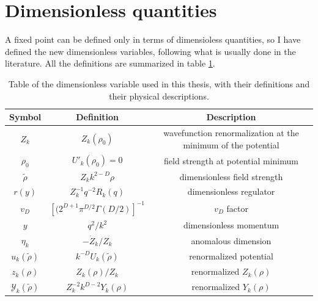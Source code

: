 \section{Dimensionless quantities}
A fixed point can be defined only in terms of dimensioless quantities, so I have defined the new dimensionless variables, following what is usually done in the literature. All the definitions are summarized in table \ref{tab:DIMENSIONLESS}.


\begin{table}
  \begin{center}
    \begin{small}
      \begin{tabular}{|c|c|c|}

\hline
 \textbf{Symbol}& \textbf{Definition} & \textbf{Description}  \\
\hline
$Z_k$ & $Z_k(\rho_0)$ & wavefunction renormalization at the minimum of the potential\\
\hline
$\rho_0$ & $U'_k(\rho_0) = 0$ & field strength at potential minimum\\
\hline
$\widetilde{\rho}$ & $Z_kk^{2-D}\rho$ & dimensionless field strength \\
\hline
$r(y)$ & $Z^{-1}_k q^{-2}R_k(q)$ & dimensionless regulator\\
\hline
$v_D$ & $[(2^{D + 1}\pi^{D/2}\Gamma(D/2)]^{-1}$ & $v_D$ factor\\
\hline
$y$ & $q^2/k^2$ & dimensionless momentum\\
\hline
$\eta_k$ & $-\dot{Z}_k/Z_k$ & anomalous dimension\\
\hline
$u_k(\widetilde{\rho})$ & $k^{-D}U_k(\widetilde{\rho})$ & renormalized potential\\
\hline
$z_k(\rho)$ & $Z_k(\rho)/Z_k$ & renormalized $Z_k(\rho)$\\
\hline
$\mathcal{Y}_k(\widetilde{\rho})$ & $Z_k^{-2}k^{D-2}Y_k(\rho)$ & renormalized $Y_k(\rho)$\\
\hline
      \end{tabular}
    \end{small}
  \end{center}
\caption{Table of the dimensionless variable used in this thesis, with their definitions and their physical descriptions.}
\label{tab:DIMENSIONLESS}

\end{table}


